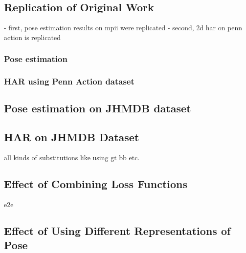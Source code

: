 \subsection{Replication of Original Work}
\label{sec:exp-replication}
- first, pose estimation results on mpii were replicated
- second, 2d har on penn action is replicated

\subsubsection{Pose estimation}

\subsubsection{HAR using Penn Action dataset}

\subsection{Pose estimation on JHMDB dataset}

\subsection{HAR on JHMDB Dataset}
all kinds of substitutions like using gt bb etc.

\subsection{Effect of Combining Loss Functions}
e2e

\subsection{Effect of Using Different Representations of Pose}
\label{sec:different_pose_representation_experiment}

